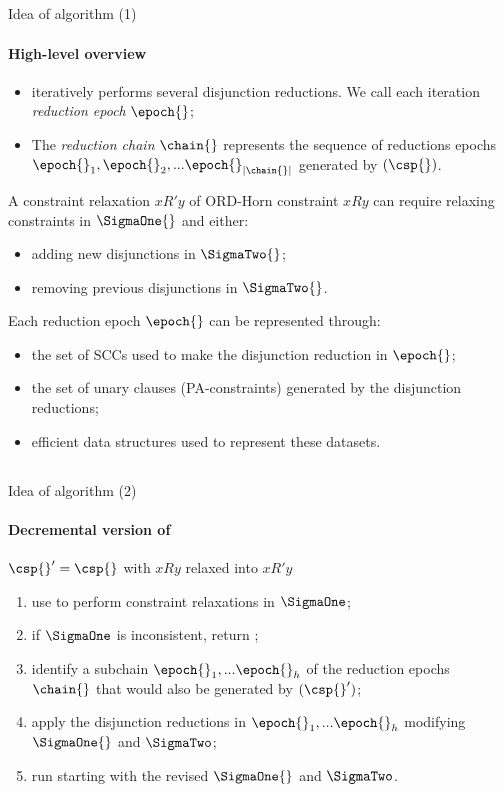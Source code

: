 \subsection{}
\begin{frame}{Idea of \DOHSAT{} algorithm (1)}
	\framesubtitle{High-level overview}

	\begin{itemize}
		\item \OHSAT{} iteratively performs several disjunction reductions. We call each iteration \textit{reduction epoch} $\epoch{}$;
		\item The \textit{reduction chain} $\chain{}$ represents the sequence of reductions epochs $\epoch{}_1, \epoch{}_2, ... \epoch{}_{|\chain{}|}$ generated by \OHSAT{}$(\csp{})$.
	\end{itemize}
	
	A constraint relaxation $xR'y$ of ORD-Horn constraint $xRy$ can require relaxing constraints in $\SigmaOne{}$ and either:
	\begin{itemize}
		\item adding new disjunctions in $\SigmaTwo{}$;
		\item removing previous disjunctions in $\SigmaTwo{}$.
	\end{itemize}
	
	Each reduction epoch $\epoch{}$ can be represented through:
	\begin{itemize}
		\item the set of SCCs used to make the disjunction reduction in $\epoch{}$;
		\item the set of unary clauses (PA-constraints) generated by the disjunction reductions;
		\item efficient data structures used to represent these datasets.
	\end{itemize}

\end{frame}

\subsection{}
\begin{frame}{Idea of \DOHSAT{} algorithm (2)}
	\framesubtitle{Decremental version of \OHSAT{}}
	
	$\csp{}' = \csp{}$ with $xRy$ relaxed into $xR'y$	
	
	\begin{enumerate}
		\item {\color{blue} use \DPASAT{}} to perform constraint relaxations in $\SigmaOne$;
		\item if $\SigmaOne$ is inconsistent, return ;
		\item {\color{blue} identify a subchain $\epoch{}_1, ... \epoch{}_h$ of the reduction epochs} $\chain{}$ that would also be generated by \OHSAT{}$(\csp{}')$;
		\item apply the disjunction reductions in $\epoch{}_1, ... \epoch{}_h$ modifying $\SigmaOne{}$ and $\SigmaTwo$;
		\item run \OHSAT{} starting with the revised $\SigmaOne{}$ and $\SigmaTwo$.
	\end{enumerate}
	
\end{frame}
